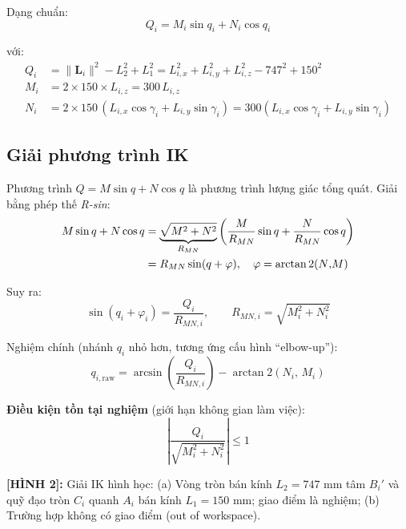 \documentclass[12pt,a4paper]{article}
\newcommand{\figref}[2]{%
  \begin{mdframed}[
    linecolor=blue!50, linewidth=1pt,
    backgroundcolor=blue!3,
    innerleftmargin=6pt, innerrightmargin=6pt,
    innertopmargin=4pt, innerbottommargin=4pt
  ]
  {\small\bfseries [H\`{I}NH #1]:} {\small #2}
  \end{mdframed}
}
\newcommand{\Lvec}{\mathbf{L}}
\begin{document}
Dạng chuẩn:
\begin{equation}
\boxed{Q_i = M_i\sin q_i + N_i\cos q_i}
\label{eq:IK_std}
\end{equation}

với:
\begin{align}
  Q_i &= \|\Lvec_i\|^2 - L_2^2 + L_1^2
         = L_{i,x}^2 + L_{i,y}^2 + L_{i,z}^2 - 747^2 + 150^2 \label{eq:Qi}\\
  M_i &= 2 \times 150 \times L_{i,z} = 300\,L_{i,z} \label{eq:Mi}\\
  N_i &= 2 \times 150\,(L_{i,x}\cos\gamma_i + L_{i,y}\sin\gamma_i)
         = 300(L_{i,x}\cos\gamma_i + L_{i,y}\sin\gamma_i) \label{eq:Ni}
\end{align}

\subsection{Giải phương trình IK}

Phương trình $Q = M\sin q + N\cos q$ là phương trình lượng giác tổng quát.
Giải bằng phép thế \emph{R-sin}:
\begin{align}
  M\sin q + N\cos q
  &= \underbrace{\sqrt{M^2+N^2}}_{R_{MN}}\left(\frac{M}{R_{MN}}\sin q + \frac{N}{R_{MN}}\cos q\right)\notag\\
  &= R_{MN}\sin(q + \varphi), \quad \varphi = \arctan2(N{,}M)
  \label{eq:Rsin}
\end{align}

Suy ra:
\begin{equation}
  \sin(q_i + \varphi_i) = \frac{Q_i}{R_{MN,i}}, \qquad R_{MN,i} = \sqrt{M_i^2 + N_i^2}
\end{equation}

Nghiệm chính (nhánh $q_i$ nhỏ hơn, tương ứng cấu hình ``elbow-up''):
\begin{equation}
\boxed{
  q_{i,\text{raw}} = \arcsin\!\left(\frac{Q_i}{R_{MN,i}}\right) - \arctan2(N_i{,}\,M_i)
}
\label{eq:IK_sol}
\end{equation}

\textbf{Điều kiện tồn tại nghiệm} (giới hạn không gian làm việc):
\begin{equation}
  \left|\frac{Q_i}{\sqrt{M_i^2+N_i^2}}\right| \leq 1
  \label{eq:workspace}
\end{equation}

\figref{2}{Giải IK hình học: (a) Vòng tròn bán kính $L_2=747$ mm tâm $B_i'$
và quỹ đạo tròn $C_i$ quanh $A_i$ bán kính $L_1=150$ mm; giao điểm là
nghiệm; (b) Trường hợp không có giao điểm (out of workspace).}
\end{document}
